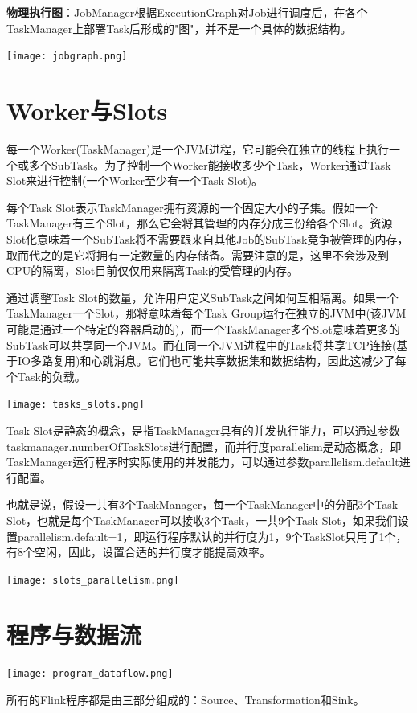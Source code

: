 \documentclass[oneside]{ctexbook}
\begin{document}
\textbf{物理执行图}：JobManager根据ExecutionGraph对Job进行调度后，在各个TaskManager上部署Task后形成的"图"，并不是一个具体的数据结构。

\noindent \texttt{[image: jobgraph.png]}

\section{Worker与Slots}

每一个Worker(TaskManager)是一个JVM进程，它可能会在独立的线程上执行一个或多个SubTask。为了控制一个Worker能接收多少个Task，Worker通过Task Slot来进行控制(一个Worker至少有一个Task Slot)。

每个Task Slot表示TaskManager拥有资源的一个固定大小的子集。假如一个TaskManager有三个Slot，那么它会将其管理的内存分成三份给各个Slot。资源Slot化意味着一个SubTask将不需要跟来自其他Job的SubTask竞争被管理的内存，取而代之的是它将拥有一定数量的内存储备。需要注意的是，这里不会涉及到CPU的隔离，Slot目前仅仅用来隔离Task的受管理的内存。

通过调整Task Slot的数量，允许用户定义SubTask之间如何互相隔离。如果一个TaskManager一个Slot，那将意味着每个Task Group运行在独立的JVM中(该JVM可能是通过一个特定的容器启动的)，而一个TaskManager多个Slot意味着更多的SubTask可以共享同一个JVM。而在同一个JVM进程中的Task将共享TCP连接(基于IO多路复用)和心跳消息。它们也可能共享数据集和数据结构，因此这减少了每个Task的负载。

\noindent \texttt{[image: tasks\_slots.png]}

Task Slot是静态的概念，是指TaskManager具有的并发执行能力，可以通过参数taskmanager.numberOfTaskSlots进行配置，而并行度parallelism是动态概念，即TaskManager运行程序时实际使用的并发能力，可以通过参数parallelism.default进行配置。

也就是说，假设一共有3个TaskManager，每一个TaskManager中的分配3个Task Slot，也就是每个TaskManager可以接收3个Task，一共9个Task Slot，如果我们设置parallelism.default=1，即运行程序默认的并行度为1，9个TaskSlot只用了1个，有8个空闲，因此，设置合适的并行度才能提高效率。

\noindent \texttt{[image: slots\_parallelism.png]}

\section{程序与数据流}

\noindent \texttt{[image: program\_dataflow.png]}

所有的Flink程序都是由三部分组成的：Source、Transformation和Sink。
\end{document}
